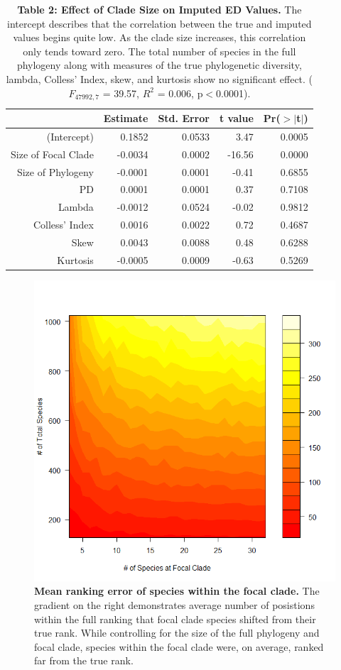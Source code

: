 \documentclass[12pt,english]{article}
\begin{document}
\begin{table}[ht] 
\centering
\begin{tabular}{rrrrr}
  \hline
  & Estimate & Std. Error & t value & Pr($>$$|$t$|$) \\
   \hline
 (Intercept) & 0.1852 & 0.0533 & 3.47 & 0.0005 \\
   Size of Focal Clade & -0.0034 & 0.0002 & -16.56 & 0.0000 \\
   Size of Phylogeny & -0.0001 & 0.0001 & -0.41 & 0.6855 \\
   PD & 0.0001 & 0.0001 & 0.37 & 0.7108 \\
   Lambda & -0.0012 & 0.0524 & -0.02 & 0.9812 \\
   Colless' Index & 0.0016 & 0.0022 & 0.72 & 0.4687 \\
   Skew & 0.0043 & 0.0088 & 0.48 & 0.6288 \\
   Kurtosis & -0.0005 & 0.0009 & -0.63 & 0.5269 \\
   \hline
   \hline
\end{tabular}
\caption*{\textbf{Table 2: Effect of Clade Size on Imputed ED Values.} The
intercept describes that the correlation between the true and imputed values
begins quite low. As the clade size increases, this correlation only tends
toward zero. The total number of species in the full phylogeny along with
measures of the true phylogenetic diversity, lambda, Colless' Index, skew, and
kurtosis show no significant effect. ($F_{47992, 7}$ = 39.57, $R^{2}$ = 0.006,
p$<$0.0001).}
\end{table}

\begin{figure}[!ht]
  \center
  \includegraphics[width=.5\textwidth]{rankingError.png}
  \caption{\textbf{Mean ranking error of species within the focal clade.} The 
  gradient on the right demonstrates average number of posistions within the 
  full ranking that focal clade species shifted from their true rank.
  While controlling for the size of the full phylogeny and focal clade, species 
  within the focal clade were, on average, ranked far from the true rank. }
  \label{rankingError}
\end{figure}
\end{document}

